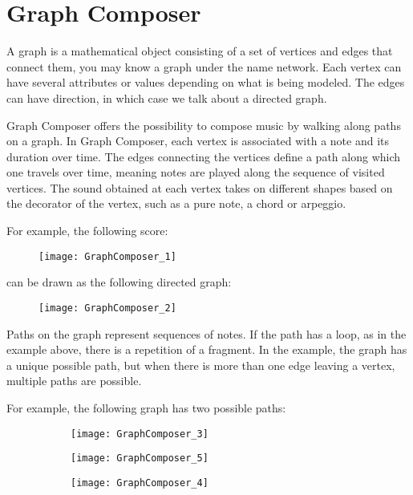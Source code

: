 \section{Graph Composer}
A graph is a mathematical object consisting of a set of vertices and edges that connect them, you may know a graph under the name network. Each vertex can have several attributes or values depending on what is being modeled. The edges can have direction, in which case we talk about a directed graph.

Graph Composer offers the possibility to compose music by walking along paths on a graph. In Graph Composer, each vertex is associated with a note and its duration over time. The edges connecting the vertices define a path along which one travels over time, meaning notes are played along the sequence of visited vertices. The sound obtained at each vertex takes on different shapes based on the decorator of the vertex, such as a pure note, a chord or arpeggio.

For example, the following score:
\begin{figure}[h]
\centering
\texttt{[image: GraphComposer\_1]}
\end{figure}

can be drawn as the following directed graph:
\begin{figure}[h]
\centering
\texttt{[image: GraphComposer\_2]}
\end{figure}

Paths on the graph represent sequences of notes. If the path has a loop, as in the example above, there is a repetition of a fragment. In the example, the graph has a unique possible path, but when there is more than one edge leaving a vertex, multiple paths are possible.

For example, the following graph has two possible paths:

\begin{figure}[h]
\centering
\begin{subfigure}{0.45\textwidth}
\centering
\texttt{[image: GraphComposer\_3]}
\end{subfigure}

\begin{subfigure}{0.45\textwidth}
\centering
\texttt{[image: GraphComposer\_5]}
\end{subfigure}
\begin{subfigure}{0.45\textwidth}
\centering
\texttt{[image: GraphComposer\_4]}
\end{subfigure}
\end{figure}

